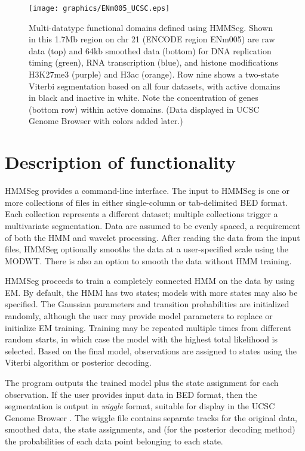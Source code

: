 \documentclass{bioinfo}
\begin{document}
\begin{figure}
  \centering
  \texttt{[image: graphics/ENm005\_UCSC.eps]}
  \caption{Multi-datatype functional domains defined using HMMSeg.
   Shown in this 1.7Mb region on chr 21 (ENCODE region ENm005) are raw
   data (top) and 64kb smoothed data (bottom) for DNA replication
   timing (green), RNA transcription (blue), and histone modifications
   H3K27me3 (purple) and H3ac (orange).  Row nine shows a two-state
   Viterbi segmentation based on all four datasets, with active domains
   in black and inactive in white. Note the concentration of genes
    (bottom row) within active domains. (Data displayed in UCSC Genome
  Browser with colors added later.)}
  \label{ucsc}
\end{figure}

\section{Description of functionality}

HMMSeg provides a command-line interface.  The input to HMMSeg is one
or more collections of files in either single-column or tab-delimited
BED format.  Each collection represents a different dataset; multiple
collections trigger a multivariate segmentation.  Data are assumed to
be evenly spaced, a requirement of both the HMM and wavelet
processing.  After reading the data from the input files, HMMSeg
optionally smooths the data at a user-specified scale using the MODWT.
There is also an option to smooth the data without HMM training.

HMMSeg proceeds to train a completely connected HMM on the data by using
EM.  By default, the HMM has two states; models with more states may
also be specified.  The Gaussian parameters and transition
probabilities are initialized randomly, although the user may provide
model parameters to replace or initialize EM training.  Training may
be repeated multiple times from different random starts, in which case
the model with the highest total likelihood is 
selected.  Based on the final model, observations are assigned to
states using the Viterbi algorithm or posterior decoding.

The program outputs the trained model plus the state assignment for
each observation.  If the user provides input data in BED format, then
the segmentation is output in {\it wiggle} format, suitable for
display in the UCSC Genome Browser \citep{kent:human}.  The wiggle
file contains separate tracks for the original data, smoothed data,
the state assignments, and (for the posterior decoding method) the
probabilities of each data point belonging to each state.
\end{document}

